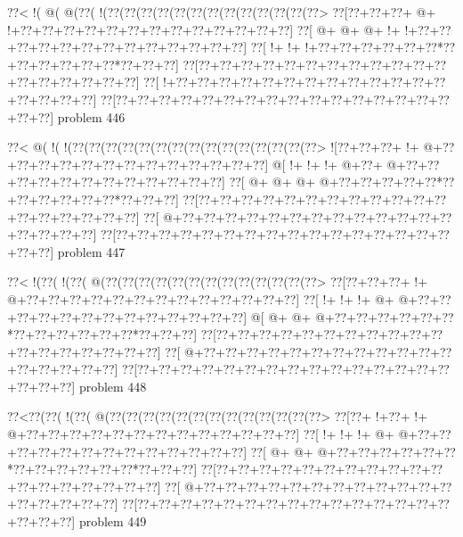 \vbox{\vbox{\goo
\0??<\- !(\- @(\- @(\0??(\- !(\0??(\0??(\0??(\0??(\0??(\0??(\0??(\0??(\0??(\0??(\0??(\0??(\0??>
\0??[\0??+\0??+\0??+\- @+\- !+\0??+\0??+\0??+\0??+\0??+\0??+\0??+\0??+\0??+\0??+\0??+\0??+\0??]
\0??[\- @+\- @+\- @+\- !+\- !+\0??+\0??+\0??+\0??+\0??+\0??+\0??+\0??+\0??+\0??+\0??+\0??+\0??]
\0??[\- !+\- !+\- !+\0??+\0??+\0??+\0??+\0??+\0??*\0??+\0??+\0??+\0??+\0??+\0??*\0??+\0??+\0??]
\0??[\0??+\0??+\0??+\0??+\0??+\0??+\0??+\0??+\0??+\0??+\0??+\0??+\0??+\0??+\0??+\0??+\0??+\0??]
\0??[\- !+\0??+\0??+\0??+\0??+\0??+\0??+\0??+\0??+\0??+\0??+\0??+\0??+\0??+\0??+\0??+\0??+\0??]
\0??[\0??+\0??+\0??+\0??+\0??+\0??+\0??+\0??+\0??+\0??+\0??+\0??+\0??+\0??+\0??+\0??+\0??+\0??]
}
\hfil problem 446\hfil\break
}



\vbox{\vbox{\goo
\0??<\- @(\- !(\- !(\0??(\0??(\0??(\0??(\0??(\0??(\0??(\0??(\0??(\0??(\0??(\0??(\0??(\0??(\0??>
\- ![\0??+\0??+\0??+\- !+\- @+\0??+\0??+\0??+\0??+\0??+\0??+\0??+\0??+\0??+\0??+\0??+\0??+\0??]
\- @[\- !+\- !+\- !+\- @+\0??+\- @+\0??+\0??+\0??+\0??+\0??+\0??+\0??+\0??+\0??+\0??+\0??+\0??]
\0??[\- @+\- @+\- @+\- @+\0??+\0??+\0??+\0??+\0??*\0??+\0??+\0??+\0??+\0??+\0??*\0??+\0??+\0??]
\0??[\0??+\0??+\0??+\0??+\0??+\0??+\0??+\0??+\0??+\0??+\0??+\0??+\0??+\0??+\0??+\0??+\0??+\0??]
\0??[\- @+\0??+\0??+\0??+\0??+\0??+\0??+\0??+\0??+\0??+\0??+\0??+\0??+\0??+\0??+\0??+\0??+\0??]
\0??[\0??+\0??+\0??+\0??+\0??+\0??+\0??+\0??+\0??+\0??+\0??+\0??+\0??+\0??+\0??+\0??+\0??+\0??]
}
\hfil problem 447\hfil\break
}



\vbox{\vbox{\goo
\0??<\- !(\0??(\- !(\0??(\- @(\0??(\0??(\0??(\0??(\0??(\0??(\0??(\0??(\0??(\0??(\0??(\0??(\0??>
\0??[\0??+\0??+\0??+\- !+\- @+\0??+\0??+\0??+\0??+\0??+\0??+\0??+\0??+\0??+\0??+\0??+\0??+\0??]
\0??[\- !+\- !+\- !+\- @+\- @+\0??+\0??+\0??+\0??+\0??+\0??+\0??+\0??+\0??+\0??+\0??+\0??+\0??]
\- @[\- @+\- @+\- @+\0??+\0??+\0??+\0??+\0??+\0??*\0??+\0??+\0??+\0??+\0??+\0??*\0??+\0??+\0??]
\0??[\0??+\0??+\0??+\0??+\0??+\0??+\0??+\0??+\0??+\0??+\0??+\0??+\0??+\0??+\0??+\0??+\0??+\0??]
\0??[\- @+\0??+\0??+\0??+\0??+\0??+\0??+\0??+\0??+\0??+\0??+\0??+\0??+\0??+\0??+\0??+\0??+\0??]
\0??[\0??+\0??+\0??+\0??+\0??+\0??+\0??+\0??+\0??+\0??+\0??+\0??+\0??+\0??+\0??+\0??+\0??+\0??]
}
\hfil problem 448\hfil\break
}



\vbox{\vbox{\goo
\0??<\0??(\0??(\- !(\0??(\- @(\0??(\0??(\0??(\0??(\0??(\0??(\0??(\0??(\0??(\0??(\0??(\0??(\0??>
\0??[\0??+\- !+\0??+\- !+\- @+\0??+\0??+\0??+\0??+\0??+\0??+\0??+\0??+\0??+\0??+\0??+\0??+\0??]
\0??[\- !+\- !+\- !+\- @+\- @+\0??+\0??+\0??+\0??+\0??+\0??+\0??+\0??+\0??+\0??+\0??+\0??+\0??]
\0??[\- @+\- @+\- @+\0??+\0??+\0??+\0??+\0??+\0??*\0??+\0??+\0??+\0??+\0??+\0??*\0??+\0??+\0??]
\0??[\0??+\0??+\0??+\0??+\0??+\0??+\0??+\0??+\0??+\0??+\0??+\0??+\0??+\0??+\0??+\0??+\0??+\0??]
\0??[\- @+\0??+\0??+\0??+\0??+\0??+\0??+\0??+\0??+\0??+\0??+\0??+\0??+\0??+\0??+\0??+\0??+\0??]
\0??[\0??+\0??+\0??+\0??+\0??+\0??+\0??+\0??+\0??+\0??+\0??+\0??+\0??+\0??+\0??+\0??+\0??+\0??]
}
\hfil problem 449\hfil\break
}



